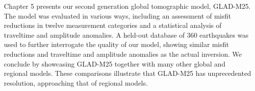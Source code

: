 Chapter 5 presents our second generation global tomographic model, GLAD-M25.
The model was evaluated in
various ways, including an assessment of misfit reductions in twelve measurement categories and
a statistical analysis of traveltime and amplitude anomalies.
A held-out database of 360 earthquakes was used to further interrogate the quality of our model,
showing similar misfit reductions and traveltime and amplitude anomalies as the actual inversion.
We conclude by showcasing GLAD-M25 together with many other global and regional models.
These comparisons illustrate that GLAD-M25 has unprecedented resolution, approaching that of regional models.

